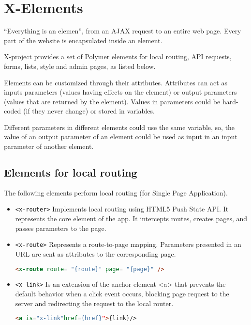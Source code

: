\section{X-Elements}
\label{sec:XPR_xel}

``Everything is an elemen'', from an AJAX request to an entire web page. Every part of the website is encapsulated inside an element.

X-project provides a set of Polymer elements for local routing, API requests, forms, lists, style and admin pages, as listed below.

Elements can be customized through their attributes. Attributes can act as inputs parameters (values having effects on the element) or output parameters (values that are returned by the element). Values in parameters could be hard-coded (if they never change) or stored in variables.

Different parameters in different elements could use the same variable, so, the value of an output parameter of an element could be used as input in an input parameter of another element.

\subsection{Elements for local routing}

The following elements perform local routing (for Single Page Application).
\begin{itemize}
\item \texttt{<x-router>} Implements local routing using HTML5 Push State API. It represents the core element of the app. It intercepts routes, creates pages, and passes parameters to the page.
\item \texttt{<x-route>} Represents a route-to-page mapping. Parameters presented in an URL are sent as attributes to the corresponding page.
\begin{lstlisting}[language=html]
<x-route route= "{route}" page= "{page}" />
\end{lstlisting}
\item \texttt{<x-link>} Is an extension of the anchor element <a> that prevents the default behavior when a click event occurs, blocking page request to the server and redirecting the request to the local router.
\begin{lstlisting}[language=html]
<a is="x-link"href={href}">{link}/>
\end{lstlisting}
\end{itemize}

